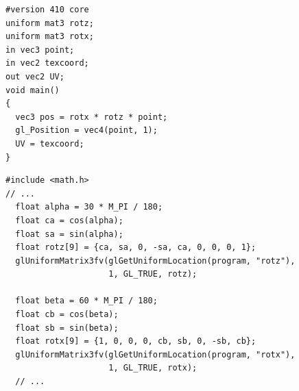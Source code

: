 \documentclass[calcdimensions,landscape,letterpaper]{powersem}
\newcommand{\thecurrentheading}{}
\newcommand{\heading}[1]{\renewcommand{\thecurrentheading}{#1}}
\begin{document}
\begin{slide}
    \heading{3D: Rotations}
    \begin{center}
        \begin{minipage}[c]{.5\textwidth}
            \begin{verbatim}
#version 410 core
uniform mat3 rotz;
uniform mat3 rotx;
in vec3 point;
in vec2 texcoord;
out vec2 UV;
void main()
{
  vec3 pos = rotx * rotz * point;
  gl_Position = vec4(point, 1);
  UV = texcoord;
}
            \end{verbatim}
        \end{minipage}
    \end{center}
\end{slide}

\begin{slide}
    \heading{3D: Uniform Rotation Matrices}
    \begin{center}
        \begin{minipage}[c]{.95\textwidth}
            \begin{verbatim}
#include <math.h>
// ...
  float alpha = 30 * M_PI / 180;
  float ca = cos(alpha);
  float sa = sin(alpha);
  float rotz[9] = {ca, sa, 0, -sa, ca, 0, 0, 0, 1};
  glUniformMatrix3fv(glGetUniformLocation(program, "rotz"),
                     1, GL_TRUE, rotz);

  float beta = 60 * M_PI / 180;
  float cb = cos(beta);
  float sb = sin(beta);
  float rotx[9] = {1, 0, 0, 0, cb, sb, 0, -sb, cb};
  glUniformMatrix3fv(glGetUniformLocation(program, "rotx"),
                     1, GL_TRUE, rotx);
  // ...
            \end{verbatim}
        \end{minipage}
    \end{center}
\end{slide}
\end{document}

